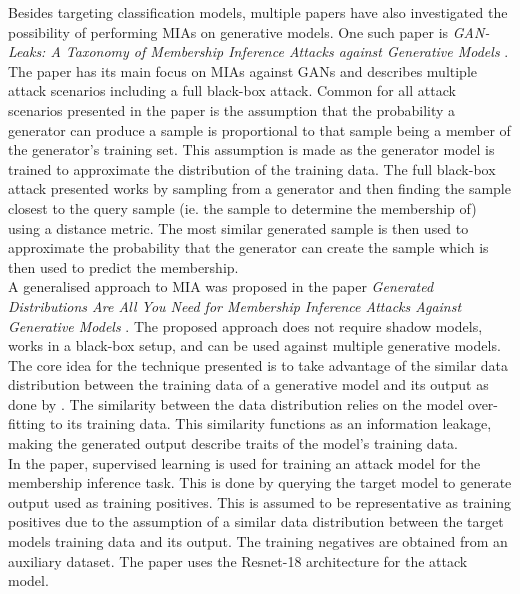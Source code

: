 Besides targeting classification models, multiple papers have also investigated the possibility of performing MIAs on generative models. One such paper is \textit{GAN-Leaks: A Taxonomy of Membership Inference Attacks against Generative Models} \cite{Chen_2020}. The paper has its main focus on MIAs against \acrlong{GAN}s and describes multiple attack scenarios including a full black-box attack. Common for all attack scenarios presented in the paper is the assumption that the probability a generator can produce a sample is proportional to that sample being a member of the generator's training set. This assumption is made as the generator model is trained to approximate the distribution of the training data. The full black-box attack presented works by sampling from a generator and then finding the sample closest to the query sample (ie. the sample to determine the membership of) using a distance metric. The most similar generated sample is then used to approximate the probability that the generator can create the sample which is then used to predict the membership.\\
A generalised approach to MIA was proposed in the paper \textit{Generated Distributions Are All You Need for Membership Inference Attacks Against Generative Models} \cite{zhang2023generated}. The proposed approach does not require shadow models, works in a black-box setup, and can be used against multiple generative models. The core idea for the technique presented is to take advantage of the similar data distribution between the training data of a generative model and its output as done by \cite{Chen_2020}. The similarity between the data distribution relies on the model over-fitting to its training data. This similarity functions as an information leakage, making the generated output describe traits of the model's training data.\\
In the paper, supervised learning is used for training an attack model for the membership inference task. This is done by querying the target model to generate output used as training positives. This is assumed to be representative as training positives due to the assumption of a similar data distribution between the target models training data and its output. The training negatives are obtained from an auxiliary dataset. The paper uses the Resnet-18 architecture for the attack model.
